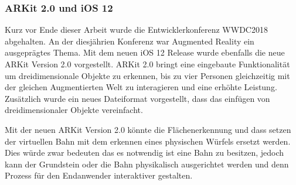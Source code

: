 \subsubsection{ARKit 2.0 und iOS 12}
Kurz vor Ende dieser Arbeit wurde die Entwicklerkonferenz WWDC2018 abgehalten. An der diesjährien Konferenz war Augmented Reality ein ausgeprägtes Thema. Mit dem neuen iOS 12 Release wurde ebenfalls die neue ARKit Version 2.0 vorgestellt. ARKit 2.0 bringt eine eingebaute Funktionalität um dreidimensionale Objekte zu erkennen, bis zu vier Personen gleichzeitig mit der gleichen Augmentierten Welt zu interagieren und eine erhöhte Leistung. Zusätzlich wurde ein neues Dateiformat vorgestellt, dass das einfügen von dreidimensionaler Objekte vereinfacht. 

Mit der neuen ARKit Version 2.0 könnte die Flächenerkennung und dass setzen der virtuellen Bahn mit dem erkennen eines physischen Würfels ersetzt werden. Dies würde zwar bedeuten das es notwendig ist eine Bahn zu besitzen, jedoch kann der Grundstein oder die Bahn physikalisch ausgerichtet werden und denn Prozess für den Endanwender interaktiver gestalten.
